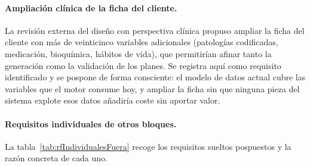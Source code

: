 \paragraph{Ampliación clínica de la ficha del cliente.}
La revisión externa del diseño con perspectiva clínica propuso ampliar la ficha del cliente con más de veinticinco variables adicionales (patologías codificadas, medicación, bioquímica, hábitos de vida), que permitirían afinar tanto la generación como la validación de los planes. Se registra aquí como requisito identificado y se pospone de forma consciente: el modelo de datos actual cubre las variables que el motor consume hoy, y ampliar la ficha sin que ninguna pieza del sistema explote esos datos añadiría coste sin aportar valor.

\paragraph{Requisitos individuales de otros bloques.}
La tabla~\ref{tab:rfIndividualesFuera} recoge los requisitos sueltos pospuestos y la razón concreta de cada uno.

